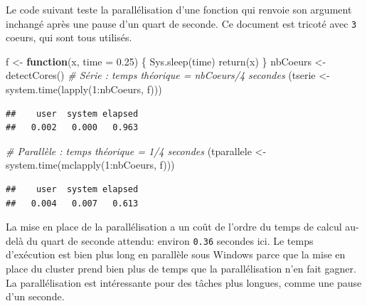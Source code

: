 \documentclass[
  11pt,
  french,
  a4paper,
  extrafontsizes,onecolumn,openright
  ]{memoir}
\newenvironment{Shaded}{\begin{snugshade}}{\end{snugshade}}
\newcommand{\AttributeTok}[1]{\textcolor[rgb]{0.77,0.63,0.00}{#1}}
\newcommand{\CommentTok}[1]{\textcolor[rgb]{0.56,0.35,0.01}{\textit{#1}}}
\newcommand{\ControlFlowTok}[1]{\textcolor[rgb]{0.13,0.29,0.53}{\textbf{#1}}}
\newcommand{\DecValTok}[1]{\textcolor[rgb]{0.00,0.00,0.81}{#1}}
\newcommand{\FloatTok}[1]{\textcolor[rgb]{0.00,0.00,0.81}{#1}}
\newcommand{\FunctionTok}[1]{\textcolor[rgb]{0.00,0.00,0.00}{#1}}
\newcommand{\NormalTok}[1]{#1}
\newcommand{\OtherTok}[1]{\textcolor[rgb]{0.56,0.35,0.01}{#1}}
\newcommand{\SpecialCharTok}[1]{\textcolor[rgb]{0.00,0.00,0.00}{#1}}
\begin{document}
\normalsize

Le code suivant teste la parallélisation d'une fonction qui renvoie son argument inchangé après une pause d'un quart de seconde.
Ce document est tricoté avec \texttt{3} coeurs, qui sont tous utilisés.

\scriptsize

\begin{Shaded}
\begin{Highlighting}[]
\NormalTok{f }\OtherTok{\textless{}{-}} \ControlFlowTok{function}\NormalTok{(x, }\AttributeTok{time =} \FloatTok{0.25}\NormalTok{) \{}
    \FunctionTok{Sys.sleep}\NormalTok{(time)}
    \FunctionTok{return}\NormalTok{(x)}
\NormalTok{\}}
\NormalTok{nbCoeurs }\OtherTok{\textless{}{-}} \FunctionTok{detectCores}\NormalTok{()}
\CommentTok{\# Série : temps théorique = nbCoeurs/4 secondes}
\NormalTok{(tserie }\OtherTok{\textless{}{-}} \FunctionTok{system.time}\NormalTok{(}\FunctionTok{lapply}\NormalTok{(}\DecValTok{1}\SpecialCharTok{:}\NormalTok{nbCoeurs, f)))}
\end{Highlighting}
\end{Shaded}

\begin{verbatim}
##    user  system elapsed 
##   0.002   0.000   0.963
\end{verbatim}

\begin{Shaded}
\begin{Highlighting}[]
\CommentTok{\# Parallèle : temps théorique = 1/4 secondes}
\NormalTok{(tparallele }\OtherTok{\textless{}{-}} \FunctionTok{system.time}\NormalTok{(}\FunctionTok{mclapply}\NormalTok{(}\DecValTok{1}\SpecialCharTok{:}\NormalTok{nbCoeurs, f)))}
\end{Highlighting}
\end{Shaded}

\begin{verbatim}
##    user  system elapsed 
##   0.004   0.007   0.613
\end{verbatim}

\normalsize

La mise en place de la parallélisation a un coût de l'ordre du temps de calcul au-delà du quart de seconde attendu: environ \texttt{0.36} secondes ici.
Le temps d'exécution est bien plus long en parallèle sous Windows parce que la mise en place du cluster prend bien plus de temps que la parallélisation n'en fait gagner.
La parallélisation est intéressante pour des tâches plus longues, comme une pause d'un seconde.
\end{document}
